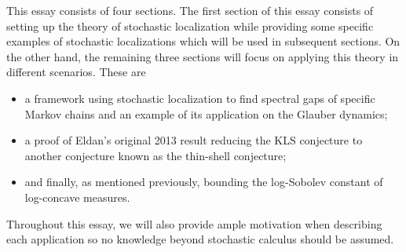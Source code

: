 This essay consists of four sections. The first section of this essay consists of setting up the 
theory of stochastic localization while providing some specific examples of stochastic localizations 
which will be used in subsequent sections. On the other hand, the remaining three sections will focus 
on applying this theory in different scenarios. These are 

\begin{itemize}
  \item a framework using stochastic localization to find spectral gaps of specific Markov chains and an 
    example of its application on the Glauber dynamics;
  \item a proof of Eldan's original 2013 result reducing the KLS conjecture to another conjecture known 
    as the thin-shell conjecture;
  \item and finally, as mentioned previously, bounding the log-Sobolev constant of log-concave measures.
\end{itemize}

Throughout this essay, we will also provide ample motivation when describing each application so 
no knowledge beyond stochastic calculus should be assumed.